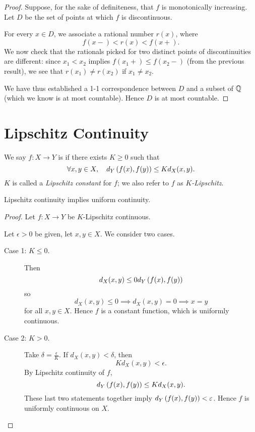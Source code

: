 \begin{proof}
Suppose, for the sake of definiteness, that $f$ is monotonically increasing. Let $D$ be the set of points at which $f$ is discontinuous.

For every $x\in D$, we associate a rational number $r(x)$, where
\[f(x-)<r(x)<f(x+).\]
We now check that the rationals picked for two distinct points of discontinuities are different: 
since $x_1<x_2$ implies $f(x_1+)\le f(x_2-)$ (from the previous result), we see that $r(x_1)\neq r(x_2)$ if $x_1\neq x_2$.

We have thus established a 1-1 correspondence between $D$ and a subset of $\mathbb Q$ (which we know is at most countable). Hence $D$ is at most countable.
\end{proof}
\pagebreak

\section{Lipschitz Continuity}
\begin{definition}
We say $f\colon X\to Y$ is  if there exists $K\ge0$ such that
\[\forall x,y\in X,\quad d_Y\left(f(x),f(y)\right)\le K d_X(x,y).\]
$K$ is called a \emph{Lipschitz constant} for $f$; we also refer to $f$ as \emph{$K$-Lipschitz}.
\end{definition}

\begin{lemma}
Lipschitz continuity implies uniform continuity.
\end{lemma}

\begin{proof}
Let $f\colon X\to Y$ be $K$-Lipschitz continuous.

Let $\epsilon>0$ be given, let $x,y\in X$. We consider two cases.
\begin{description}
\item[Case 1: $K\le0$.] Then
\[d_X(x,y)\le 0d_Y\left(f(x),f(y)\right)\]
so
\[d_X(x,y)\le0 \implies d_X(x,y)=0\implies x=y\]
for all $x,y\in X$. Hence $f$ is a constant function, which is uniformly continuous.

\item[Case 2: $K>0$.] Take $\delta=\frac{\epsilon}{K}$. If $d_X(x,y)<\delta$, then
\[Kd_X(x,y)<\epsilon.\]
By Lipschitz continuity of $f$,
\[d_Y\left(f(x),f(y)\right)\le Kd_X(x,y).\]
These last two statements together imply $d_Y\left(f(x),f(y)\right)<\varepsilon$. Hence $f$ is uniformly continuous on $X$.
\end{description}
\end{proof}

